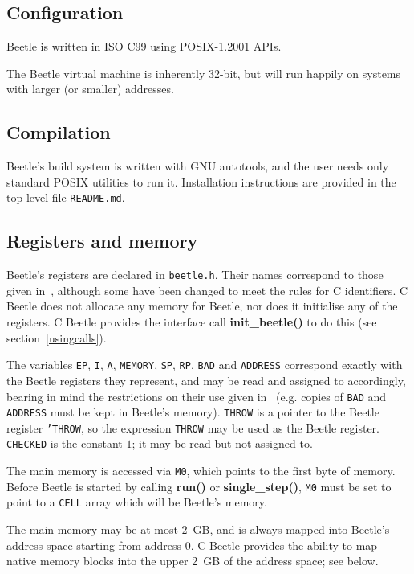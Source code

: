 \documentclass[english]{article}
\begin{document}
\subsection{Configuration}
\label{configuration}

Beetle is written in ISO C99 using POSIX-1.2001 APIs.

The Beetle virtual machine is inherently 32-bit, but will run happily on systems with larger (or smaller) addresses.


\subsection{Compilation}

Beetle's build system is written with GNU autotools, and the user
needs only standard POSIX utilities to run it. Installation
instructions are provided in the top-level file {\tt README.md}.


\subsection{Registers and memory}

Beetle's registers are declared in {\tt beetle.h}. Their names correspond to
those given in~\cite[section~2.1]{beetle}, although some have been changed
to meet the rules for C identifiers. C Beetle does not allocate any
memory for Beetle, nor does it initialise any of the registers. C Beetle
provides the interface call {\bf init\_beetle()} to do this (see
section~\ref{usingcalls}).

The variables {\tt EP}, {\tt I}, {\tt A}, {\tt MEMORY}, {\tt SP}, {\tt RP}, {\tt BAD} and {\tt ADDRESS}
correspond exactly with the Beetle registers they represent, and may be read
and assigned to accordingly, bearing in mind the restrictions on their use
given in~\cite{beetle} (e.g. copies of {\tt BAD} and {\tt ADDRESS} must be
kept in Beetle's memory). {\tt THROW} is a pointer to the Beetle register
{\tt 'THROW}, so the expression {\tt *THROW} may be used as the Beetle
register. {\tt CHECKED} is the constant $1$; it may be read but not
assigned to.

The main memory is accessed via {\tt M0}, which points to the first byte of
memory. Before Beetle is started by calling {\bf run()} or {\bf
single\_step()}, {\tt M0} must be set to point to a {\tt CELL} array which will be
Beetle's memory.

The main memory may be at most \SI{2}{GB}, and is always mapped into Beetle’s address space starting from address $0$. C Beetle provides the ability to map native memory blocks into the upper \SI{2}{GB} of the address space; see below.
\end{document}
